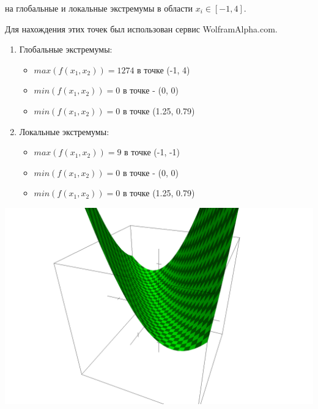 \documentclass[a4paper, 12pt]{article}   	%
\begin{document}
    на глобальные и локальные экстремумы в области $x_i \in [-1, 4]$.
    
    Для нахождения этих точек был использован сервис WolframAlpha.com.
    
    \begin{enumerate}
        \item Глобальные экстремумы:
        \begin{itemize}
            \item $max(f(x_1, x_2)) = 1274$ в точке (-1, 4)
            \item $min(f(x_1, x_2)) = 0$ в точке - (0, 0)
            \item $min(f(x_1, x_2)) = 0$ в точке (1.25, 0.79)
         \end{itemize}
         \item Локальные экстремумы:
         \begin{itemize}
             \item $max(f(x_1, x_2)) = 9$ в точке (-1, -1)
             \item $min(f(x_1, x_2)) = 0$ в точке - (0, 0)
             \item $min(f(x_1, x_2)) = 0$ в точке (1.25, 0.79)
         \end{itemize}
    \end{enumerate}
    
    \begin{center}
        \begin{minipage}{0.5\linewidth}
            \includegraphics[width=\linewidth]{img/2}
        \end{minipage}
    \end{center}
    
\end{document}
